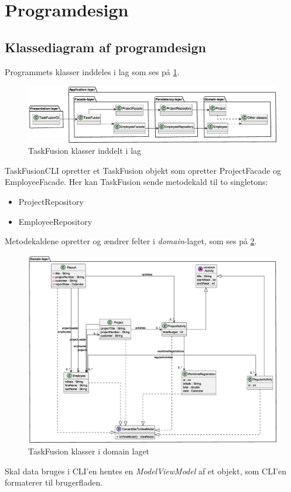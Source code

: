 \section{Programdesign}
\subsection{Klassediagram af programdesign}
Programmets klasser inddeles i lag som ses på \cref{fig:classLayers}.
\begin{figure}
    \centering
    \caption{TaskFusion klasser inddelt i lag}\label{fig:classLayers}
    \includegraphics[width=\textwidth]{ImplementationAndTest/Diagrams/ClassDiagrams/ClassDiagram_layer.eps}
\end{figure}
TaskFusionCLI opretter et TaskFusion objekt som opretter ProjectFacade og EmployeeFacade. Her kan TaskFusion sende metodekald til to singletons:
\begin{itemize}
    \item ProjectRepository
    \item EmployeeRepository
\end{itemize}
Metodekaldene opretter og ændrer felter i \textit{domain}-laget, som ses på \cref{fig:domainLayer}.
\begin{figure}
    \centering
    \caption{TaskFusion klasser i domain laget}\label{fig:domainLayer}
    \includegraphics[width=\textwidth]{ImplementationAndTest/Diagrams/ClassDiagrams/ClassDiagram_domain.eps}
\end{figure}
Skal data bruges i CLI'en hentes en \textit{ModelViewModel} af et objekt, som CLI'en formaterer til brugerfladen.
\newpage
